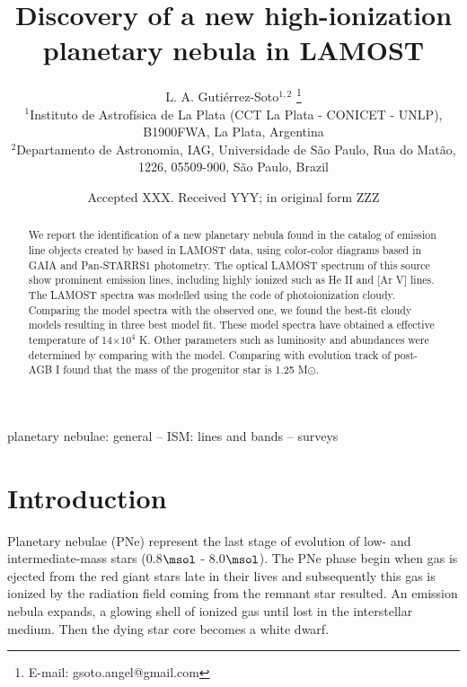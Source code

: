 \documentclass[fleqn,usenatbib]{mnras}
\title[New high-ionization planetary nebula]{Discovery of a new high-ionization planetary nebula in LAMOST}
\author[Guti\'errez-Soto et al.]{
  L. A. Guti\'errez-Soto$^{1,2}$
  \thanks{E-mail: gsoto.angel@gmail.com}
\\
$^{1}$Instituto de Astrof\'{i}sica de La Plata (CCT La Plata - CONICET - UNLP), B1900FWA, La Plata, Argentina\\
$^{2}$Departamento de Astronomia, IAG, Universidade de S\~{a}o Paulo, Rua do Mat\~{a}o, 1226, 05509-900, S\~{a}o Paulo, Brazil\\
}
\date{Accepted XXX. Received YYY; in original form ZZZ}
\begin{document}
\label{firstpage}
\pagerange{\pageref{firstpage}--\pageref{lastpage}}
\maketitle

\begin{abstract}
  We report the identification of a new planetary nebula found in the catalog of
  emission line objects created by \citet{Skoda:2020} based in LAMOST data, using
  color-color diagrams based in GAIA and Pan-STARRS1 photometry. The optical LAMOST
  spectrum of this source show prominent emission lines, including highly ionized
  such as He II and [Ar V] lines. The LAMOST spectra was
  modelled using the code of photoionization  {\sc cloudy}.
  Comparing the model spectra with the observed one, we found
  the best-fit {\sc cloudy} models resulting in three best model fit. These model spectra have
   obtained a
  effective temperature of 14$\times10^{4}$ K. Other parameters such as luminosity
  and abundances were determined by comparing with the model.
  Comparing with evolution track of post-AGB I found that the mass
  of the progenitor star is 1.25 M{$\odot$}. 
\end{abstract}

\begin{keywords}
planetary nebulae: general -- ISM: lines and bands -- surveys
\end{keywords}



\section{Introduction}

\label{sec:intro}

Planetary nebulae (PNe) represent the last stage of evolution of low- and intermediate-mass stars
(0.8$\msol$ - 8.0$\msol$). The PNe phase begin when gas is ejected from the red giant stars late
in their lives and subsequently this gas is ionized by the radiation field coming from the remnant
star resulted. An emission nebula expands, a glowing shell of ionized gas until lost in the
interstellar medium. Then the dying star core becomes a white dwarf.
\end{document}
